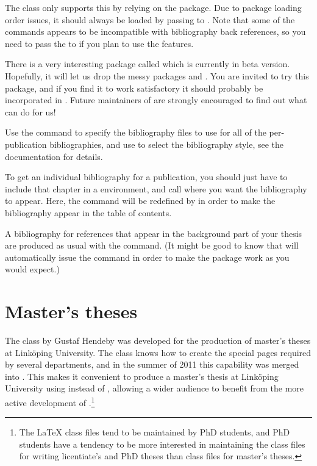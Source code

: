 The \rtthesis class only supports this by relying on the  package.  Due to package loading order issues, it should always be loaded by passing  to \rtthesis.  Note that some of the  commands appears to be incompatible with bibliography back references, so you need to pass the  to \rtthesis if you plan to use the  features.

\begin{remark}
  There is a very interesting package called  which is currently in beta version.  Hopefully, it will let us drop the messy packages  and .  You are invited to try this package, and if you find it to work satisfactory it should probably be incorporated in \rtthesis.  Future maintainers of \rtthesis are strongly encouraged to find out what  can do for us!
\end{remark}

Use the command  to specify the bibliography files to use for all of the per-publication bibliographies, and use  to select the bibliography style, see the  documentation for details.

To get an individual bibliography for a publication, you should just have to include that chapter in a  environment, and call  where you want the bibliography to appear.  Here, the  command will be redefined by \rtthesis in order to make the bibliography appear in the table of contents.

A bibliography for references that appear in the background part of your thesis are produced as usual with the  command.  (It might be good to know that \rtthesis will automatically issue the  command in order to make the  package work as you would expect.)

\section{Master's theses}\label{sec:msc}
%
The  class by Gustaf Hendeby was developed for the production of master's theses at Linköping University.  The class knows how to create the special pages required by several departments, and in the summer of 2011 this capability was merged into \rtthesis.  This makes it convenient to produce a master's thesis at Linköping University using \rtthesis instead of , allowing a wider audience to benefit from the more active development of \rtthesis.\footnote{The \LaTeX{} class files tend to be maintained by PhD students, and PhD students have a tendency to be more interested in maintaining the class files for writing licentiate's and PhD theses than class files for master's theses.}

